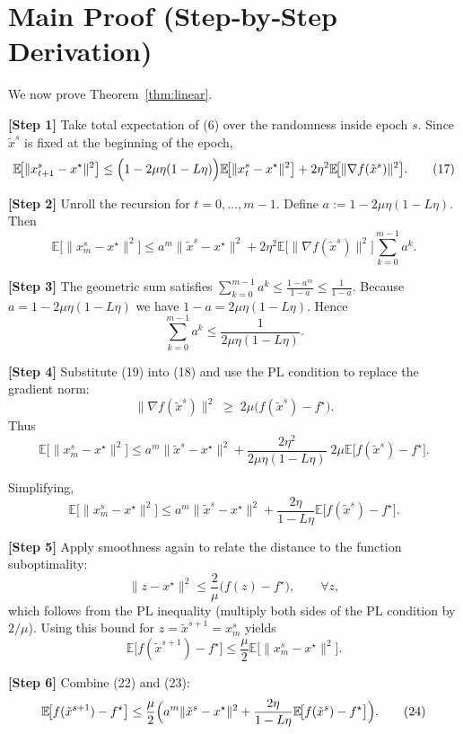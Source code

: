 \documentclass[11pt]{article}
\newcommand{\EE}{\mathbb{E}}
\begin{document}
\section*{Main Proof (Step‑by‑Step Derivation)}
We now prove Theorem~\ref{thm:linear}.  

\textbf{[Step 1]}  Take total expectation of (6) over the randomness inside epoch $s$. Since $\tilde{x}^{s}$ is fixed at the beginning of the epoch,
\[
\EE\!\bigl[\|x_{t+1}^{s}-x^{\star}\|^{2}\bigr]
\le\Bigl(1-2\mu\eta(1-L\eta)\Bigr)\EE\!\bigl[\|x_{t}^{s}-x^{\star}\|^{2}\bigr]
+2\eta^{2}\EE\!\bigl[\|\nabla f(\tilde{x}^{s})\|^{2}\bigr]. \tag{17}
\]

\textbf{[Step 2]}  Unroll the recursion for $t=0,\dots,m-1$. Define $a:=1-2\mu\eta(1-L\eta)$. Then
\[
\EE\!\bigl[\|x_{m}^{s}-x^{\star}\|^{2}\bigr]
\le a^{m}\| \tilde{x}^{s}-x^{\star}\|^{2}
+2\eta^{2}\EE\!\bigl[\|\nabla f(\tilde{x}^{s})\|^{2}\bigr]\sum_{k=0}^{m-1}a^{k}. \tag{18}
\]

\textbf{[Step 3]}  The geometric sum satisfies $\sum_{k=0}^{m-1}a^{k}\le \frac{1-a^{m}}{1-a}\le \frac{1}{1-a}$. Because $a=1-2\mu\eta(1-L\eta)$ we have $1-a=2\mu\eta(1-L\eta)$. Hence
\[
\sum_{k=0}^{m-1}a^{k}\le\frac{1}{2\mu\eta(1-L\eta)}. \tag{19}
\]

\textbf{[Step 4]}  Substitute (19) into (18) and use the PL condition to replace the gradient norm:
\[
\|\nabla f(\tilde{x}^{s})\|^{2}\;\ge\;2\mu\bigl(f(\tilde{x}^{s})-f^{\star}\bigr). \tag{20}
\]
Thus
\[
\EE\!\bigl[\|x_{m}^{s}-x^{\star}\|^{2}\bigr]
\le a^{m}\|\tilde{x}^{s}-x^{\star}\|^{2}
+\frac{2\eta^{2}}{2\mu\eta(1-L\eta)}\;2\mu\EE\!\bigl[f(\tilde{x}^{s})-f^{\star}\bigr]. \tag{21}
\]

Simplifying,
\[
\EE\!\bigl[\|x_{m}^{s}-x^{\star}\|^{2}\bigr]
\le a^{m}\|\tilde{x}^{s}-x^{\star}\|^{2}
+\frac{2\eta}{1-L\eta}\EE\!\bigl[f(\tilde{x}^{s})-f^{\star}\bigr]. \tag{22}
\]

\textbf{[Step 5]}  Apply smoothness again to relate the distance to the function suboptimality:
\[
\|z-x^{\star}\|^{2}\le\frac{2}{\mu}\bigl(f(z)-f^{\star}\bigr),\qquad\forall z,
\]
which follows from the PL inequality (multiply both sides of the PL condition by $2/\mu$). Using this bound for $z=\tilde{x}^{s+1}=x_{m}^{s}$ yields
\[
\EE\!\bigl[f(\tilde{x}^{s+1})-f^{\star}\bigr]
\le\frac{\mu}{2}\EE\!\bigl[\|x_{m}^{s}-x^{\star}\|^{2}\bigr]. \tag{23}
\]

\textbf{[Step 6]}  Combine (22) and (23):
\[
\EE\!\bigl[f(\tilde{x}^{s+1})-f^{\star}\bigr]
\le\frac{\mu}{2}\Bigl(
a^{m}\|\tilde{x}^{s}-x^{\star}\|^{2}
+\frac{2\eta}{1-L\eta}\EE\!\bigl[f(\tilde{x}^{s})-f^{\star}\bigr]\Bigr). \tag{24}
\]
\end{document}
